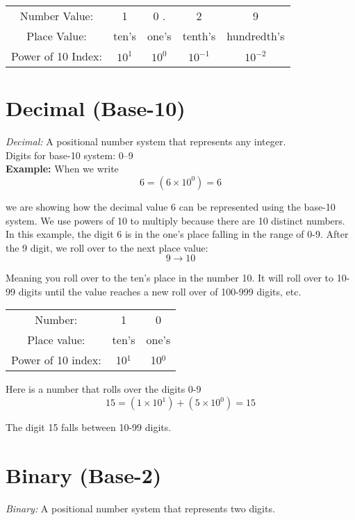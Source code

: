\documentclass{article}
\begin{document}
\begin{center}
\begin{tabular}{c c c c c}
Number Value: & 1 & 0 . & 2 & 9 \\
Place Value:  & ten's & one's & tenth's & hundredth's \\
Power of 10 Index:  & $10^1$ & $10^0$ & $10^{-1}$ & $10^{-2}$ \\
\end{tabular}
\end{center}




\section{Decimal (Base-10)}
\textit{Decimal:} A positional number system that represents any integer. \\

\noindent Digits for base-10 system: 0--9 \\

\textbf{Example:} When we write
\[
6 = (6 \times 10^0) = 6 
\]

we are showing how the decimal value 6 can be represented using the base-10 system. We use powers of 10 to multiply because there are 10 distinct numbers. In this 
example, the digit 6 is in the one's place falling in the range of 0-9. After the 9 digit, we roll over to the next place value:  
\[
9 \to 10
\]

\noindent Meaning you roll over to the ten's place in the number 10. It will roll over to 10-99 digits until the value reaches a new roll over of 100-999 digits, etc. \\

\begin{center}
\begin{tabular}{c c c}
Number: & 1 & 0 \\
Place value: & ten's & one's \\
Power of 10 index: & 10$^1$ &  10$^0$ \\
\end{tabular}
\end{center}

\noindent Here is a number that rolls over the digits 0-9
\[
15 = (1 \times 10^1) + (5 \times 10^0) = 15
\]

The digit 15 falls between 10-99 digits. 



\section{Binary (Base-2)}
\textit{Binary:} A positional number system that represents two digits. \\
\end{document}
